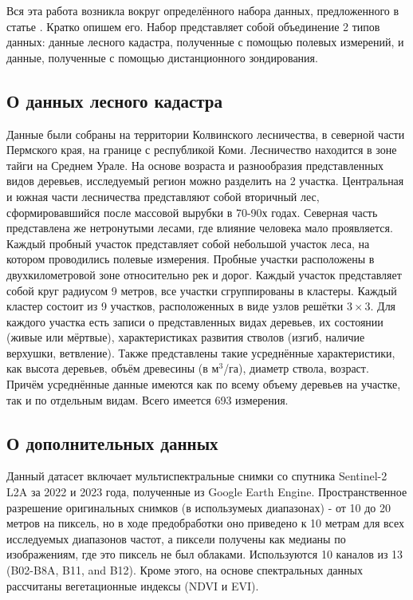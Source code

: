 \documentclass{article}
\begin{document}
Вся эта работа возникла вокруг определённого набора данных, предложенного в статье \citep{Illarionova2024timberstock}. Кратко опишем его.
Набор представляет собой объединение 2 типов данных: данные лесного кадастра, полученные с помощью полевых измерений, и данные, полученные с помощью дистанционного зондирования.

\subsection{О данных лесного кадастра}

Данные были собраны на территории Колвинского лесничества, в северной части Пермского края, на границе с республикой Коми. Лесничество находится в зоне тайги на Среднем Урале. На основе возраста и разнообразия представленных видов деревьев, исследуемый регион можно разделить на 2 участка. Центральная и южная части лесничества представляют собой вторичный лес, сформировавшийся после массовой вырубки в 70-90х годах. Северная часть представлена же нетронутыми лесами, где влияние человека мало проявляется.
Каждый пробный участок представляет собой небольшой участок леса, на котором проводились полевые измерения. Пробные участки расположены в двухкилометровой зоне относительно рек и дорог. Каждый участок представляет собой круг радиусом 9 метров, все участки сгруппированы в кластеры. Каждый кластер состоит из 9 участков, расположенных в виде узлов решётки $3 \times 3$. Для каждого участка есть записи о представленных видах деревьев, их состоянии (живые или мёртвые), характеристиках развития стволов (изгиб, наличие верхушки, ветвление). Также представлены такие усреднённые характеристики, как высота деревьев, объём древесины (в м$^3$/га), диаметр ствола, возраст. Причём усреднённые данные имеются как по всему объему деревьев на участке, так и по отдельным видам. Всего имеется 693 измерения.

\subsection{О дополнительных данных}
Данный датасет включает мультиспектральные снимки со спутника Sentinel-2 L2A за 2022 и 2023 года, полученные из Google Earth Engine. Пространственное разрешение оригинальных снимков (в использумеых диапазонах) - от 10 до 20 метров на пиксель, но в ходе предобработки оно приведено к 10 метрам для всех исследуемых диапазонов частот, а пиксели получены как медианы по изображениям, где это пиксель не был облаками. Используются 10 каналов из 13 (B02-B8A, B11, and B12). Кроме этого, на основе спектральных данных рассчитаны вегетационные индексы (NDVI и EVI). 
\end{document}
